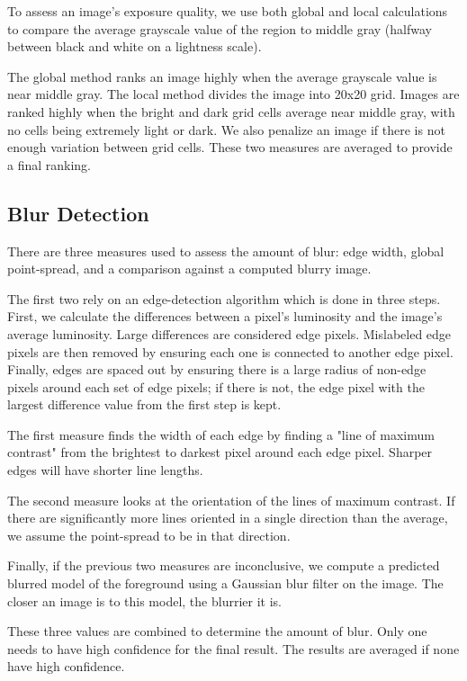 \documentclass{sig-alternate}
\begin{document}
To assess an image's exposure quality, we use both global and local calculations to compare the average grayscale value of the region to middle gray (halfway between black and white on a lightness scale)\cite{ppr:1815}.

The global method ranks an image highly when the average grayscale value is near middle gray. The local method divides the image into 20x20 grid. Images are ranked highly when the bright and dark grid cells average near middle gray, with no cells being extremely light or dark. We also penalize an image if there is not enough variation between grid cells. These two measures are averaged to provide a final ranking.

\subsection{Blur Detection}
There are three measures used to assess the amount of blur: edge width, global point-spread, and a comparison against a computed blurry image.

The first two rely on an edge-detection algorithm which is done in three steps. First, we calculate the differences between a pixel's luminosity and the image's average luminosity. Large differences are considered edge pixels. Mislabeled edge pixels are then removed by ensuring each one is connected to another edge pixel. Finally, edges are spaced out by ensuring there is a large radius of non-edge pixels around each set of edge pixels; if there is not, the edge pixel with the largest difference value from the first step is kept. %

The first measure finds the width of each edge by finding a "line of maximum contrast" from the brightest to darkest pixel around each edge pixel. Sharper edges will have shorter line lengths.

The second measure looks at the orientation of the lines of maximum contrast. If there are significantly more lines oriented in a single direction than the average, we assume the point-spread to be in that direction. %

Finally, if the previous two measures are inconclusive, we compute a predicted blurred model of the foreground using a Gaussian blur filter on the image. The closer an image is to this model, the blurrier it is.

These three values are combined to determine the amount of blur. Only one needs to have high confidence for the final result. The results are averaged if none have high confidence.%
\end{document}
